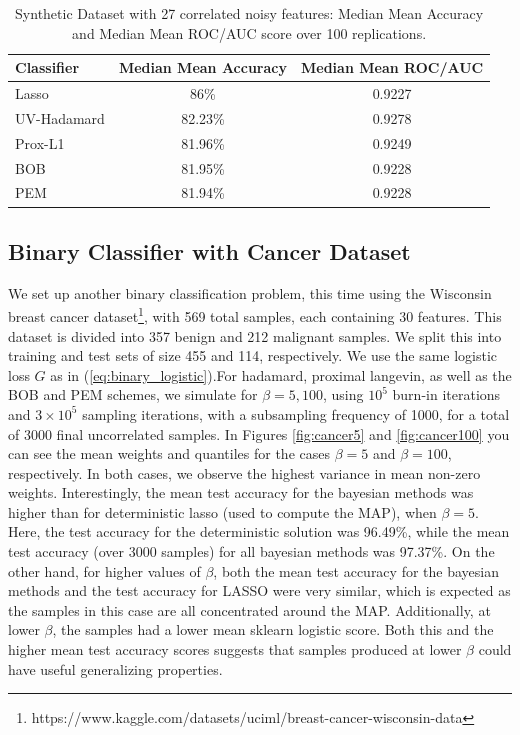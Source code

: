 \documentclass[11pt, twoside]{report}
\begin{document}
\begin{table}[h!]
    \centering
    \begin{tabular}{l c c}
        \hline
        \textbf{Classifier} & \textbf{Median Mean Accuracy} & \textbf{Median Mean ROC/AUC} \\
        \hline
        Lasso & 86\%  & 0.9227  \\
        UV-Hadamard & 82.23\%  & 0.9278  \\
        Prox-L1       & 81.96\%  & 0.9249  \\
        BOB                 & 81.95\%  & 0.9228  \\
        PEM      & 81.94\%  & 0.9228  \\
        \hline
    \end{tabular}
    \caption{Synthetic Dataset with 27 correlated noisy features: Median Mean Accuracy and Median Mean ROC/AUC score over 100 replications.}
    \label{tab:train_test_accuracy_binary_small_corr}
\end{table}

\subsection{Binary Classifier with Cancer Dataset}
We set up another binary classification problem, this time using the Wisconsin breast cancer dataset\footnote{https://www.kaggle.com/datasets/uciml/breast-cancer-wisconsin-data}, with 569 total samples, each containing 30 features. This dataset is divided into 357 benign and 212 malignant samples. We split this into training and test sets of size 455 and 114, respectively. We use the same logistic loss $G$ as in (\ref{eq:binary_logistic}).For hadamard, proximal langevin, as well as the BOB and PEM schemes, we simulate for $\beta = 5, 100$, using $10^5$ burn-in iterations and $3\times10^5$ sampling iterations, with a subsampling frequency of 1000, for a total of 3000 final uncorrelated samples. In Figures \ref{fig:cancer5} and \ref{fig:cancer100} you can see the mean weights and quantiles for the cases $\beta = 5$ and $\beta = 100$, respectively. In both cases, we observe the highest variance in mean non-zero weights. Interestingly, the mean test accuracy for the bayesian methods was higher than for deterministic lasso (used to compute the MAP), when $\beta = 5$. Here, the test accuracy for the deterministic solution was 96.49\%, while the mean test accuracy (over 3000 samples) for all bayesian methods was 97.37\%. On the other hand, for higher values of $\beta$, both the mean test accuracy for the bayesian methods and the test accuracy for LASSO were very similar, which is expected as the samples in this case are all concentrated around the MAP. Additionally, at lower $\beta$, the samples had a lower mean sklearn logistic score. Both this and the higher mean test accuracy scores suggests that samples produced at lower $\beta$ could have useful generalizing properties.
\end{document}
